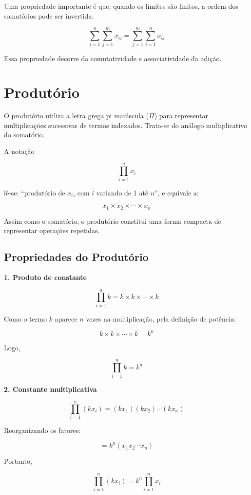 Uma propriedade importante é que, quando os limites são finitos, a ordem dos somatórios pode ser invertida:

\[
\sum_{i=1}^{n} \sum_{j=1}^{m} x_{ij}
=
\sum_{j=1}^{m} \sum_{i=1}^{n} x_{ij}
\]

Essa propriedade decorre da comutatividade e associatividade da adição.


\section{Produtório}

O produtório utiliza a letra grega pi maiúscula ($\Pi$) para representar multiplicações sucessivas de termos indexados. Trata-se do análogo multiplicativo do somatório. \vskip0.3cm

A notação

\[
\prod_{i=1}^{n} x_i
\]

lê-se: “produtório de $x_i$, com $i$ variando de 1 até $n$”, e equivale a:

\[
x_1 \times x_2 \times \cdots \times x_n
\]

Assim como o somatório, o produtório constitui uma forma compacta de representar operações repetidas.

\subsection{Propriedades do Produtório}

\textbf{1. Produto de constante}

\[
\prod_{i=1}^{n} k
=
k \times k \times \cdots \times k
\]

Como o termo $k$ aparece $n$ vezes na multiplicação, pela definição de potência:

\[
k \times k \times \cdots \times k = k^n
\]

Logo,

\[
\prod_{i=1}^{n} k = k^n
\]

\bigskip

\textbf{2. Constante multiplicativa}

\[
\prod_{i=1}^{n} (k x_i)
=
(kx_1)(kx_2)\cdots(kx_n)
\]

Reorganizando os fatores:

\[
= k^n (x_1 x_2 \cdots x_n)
\]

Portanto,

\[
\prod_{i=1}^{n} (k x_i)
=
k^n \prod_{i=1}^{n} x_i
\]

